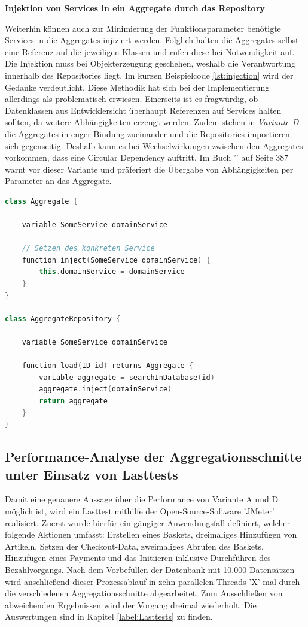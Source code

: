 \textbf{Injektion von Services in ein Aggregate durch das Repository}

Weiterhin können auch zur Minimierung der Funktionsparameter benötigte Services in die Aggregates injiziert werden. Folglich halten die Aggregates selbst eine Referenz auf die jeweiligen Klassen und rufen diese bei Notwendigkeit auf. Die Injektion muss bei Objekterzeugung geschehen, weshalb die Verantwortung innerhalb des Repositories liegt. Im kurzen Beispielcode \ref{lst:injection} wird der Gedanke verdeutlicht. Diese Methodik hat sich bei der Implementierung allerdings als problematisch erwiesen. Einerseits ist es fragwürdig, ob Datenklassen aus Entwicklersicht überhaupt Referenzen auf Services halten sollten, da weitere Abhängigkeiten erzeugt werden. Zudem stehen in \emph{Variante D} die Aggregates in enger Bindung zueinander und die Repositories importieren sich gegenseitig. Deshalb kann es bei Wechselwirkungen zwischen den Aggregates vorkommen, dass eine Circular Dependency auftritt. Im Buch '' auf Seite 387 warnt \citeauthor{Vernon.2015} vor dieser Variante und präferiert die Übergabe von Abhängigkeiten per Parameter an das Aggregate.

\begin{minipage}{\linewidth} %
	\begin{lstlisting}[caption={Injektion eines Services in ein Aggregate durch das Repository}, label={lst:injection}, language=Kotlin]
class Aggregate {
	
	variable SomeService domainService
	
	// Setzen des konkreten Service
	function inject(SomeService domainService) {
		this.domainService = domainService
	}
}

class AggregateRepository {
	
	variable SomeService domainService
	
	function load(ID id) returns Aggregate {
		variable aggregate = searchInDatabase(id)
		aggregate.inject(domainService)
		return aggregate
	}
}
	\end{lstlisting}
\end{minipage}


\subsection{Performance-Analyse der Aggregationsschnitte unter Einsatz von Lasttests}

Damit eine genauere Aussage über die Performance von Variante A und D möglich ist, wird ein Lasttest mithilfe der Open-Source-Software 'JMeter' realisiert. Zuerst wurde hierfür ein gängiger Anwendungsfall definiert, welcher folgende Aktionen umfasst: Erstellen eines Baskets, dreimaliges Hinzufügen von Artikeln, Setzen der Checkout-Data, zweimaliges Abrufen des Baskets, Hinzufügen eines Payments und das Initiieren inklusive Durchführen des Bezahlvorgangs. Nach dem Vorbefüllen der Datenbank mit 10.000 Datensätzen wird anschließend dieser Prozessablauf in zehn parallelen Threads 'X'-mal durch die verschiedenen Aggregationsschnitte abgearbeitet. Zum Ausschließen von abweichenden Ergebnissen wird der Vorgang dreimal wiederholt. Die Auswertungen sind in Kapitel \ref{label:Lasttests} zu finden.

